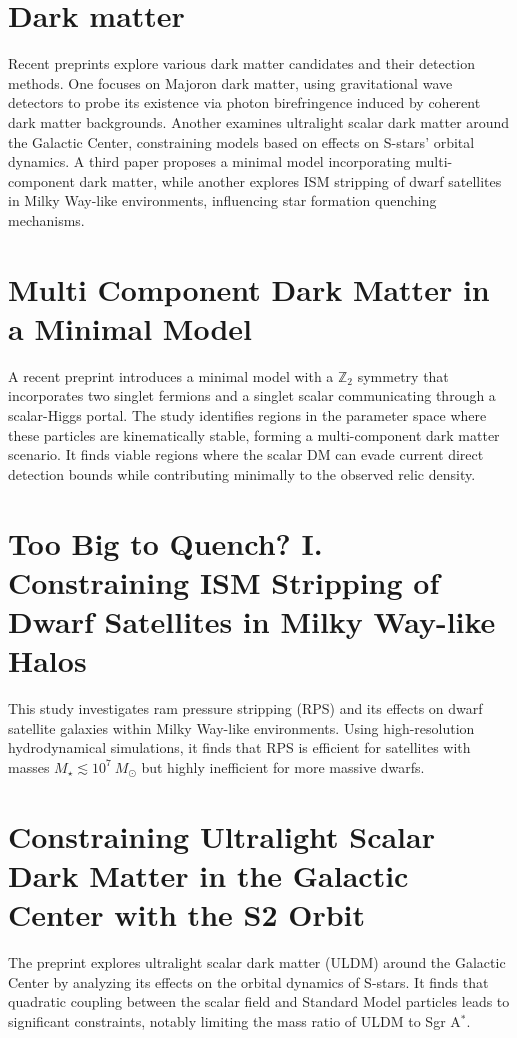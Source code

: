 \documentclass[11pt]{article}
\begin{document}
\section*{Dark matter}
Recent preprints explore various dark matter candidates and their detection methods. One focuses on Majoron dark matter, using gravitational wave detectors to probe its existence via photon birefringence induced by coherent dark matter backgrounds. Another examines ultralight scalar dark matter around the Galactic Center, constraining models based on effects on S-stars' orbital dynamics. A third paper proposes a minimal model incorporating multi-component dark matter, while another explores ISM stripping of dwarf satellites in Milky Way-like environments, influencing star formation quenching mechanisms.
\section*{Multi Component Dark Matter in a Minimal Model}
A recent preprint introduces a minimal model with a $\mathbb{Z}_2$ symmetry that incorporates two singlet fermions and a singlet scalar communicating through a scalar-Higgs portal. The study identifies regions in the parameter space where these particles are kinematically stable, forming a multi-component dark matter scenario. It finds viable regions where the scalar DM can evade current direct detection bounds while contributing minimally to the observed relic density.
\section*{Too Big to Quench? I. Constraining ISM Stripping of Dwarf Satellites in Milky Way-like Halos}
This study investigates ram pressure stripping (RPS) and its effects on dwarf satellite galaxies within Milky Way-like environments. Using high-resolution hydrodynamical simulations, it finds that RPS is efficient for satellites with masses $M_{\star} \lesssim 10^{7}\ M_{\odot}$ but highly inefficient for more massive dwarfs.
\section*{Constraining Ultralight Scalar Dark Matter in the Galactic Center with the S2 Orbit}
The preprint explores ultralight scalar dark matter (ULDM) around the Galactic Center by analyzing its effects on the orbital dynamics of S-stars. It finds that quadratic coupling between the scalar field and Standard Model particles leads to significant constraints, notably limiting the mass ratio of ULDM to Sgr A$^*$.
\end{document}
